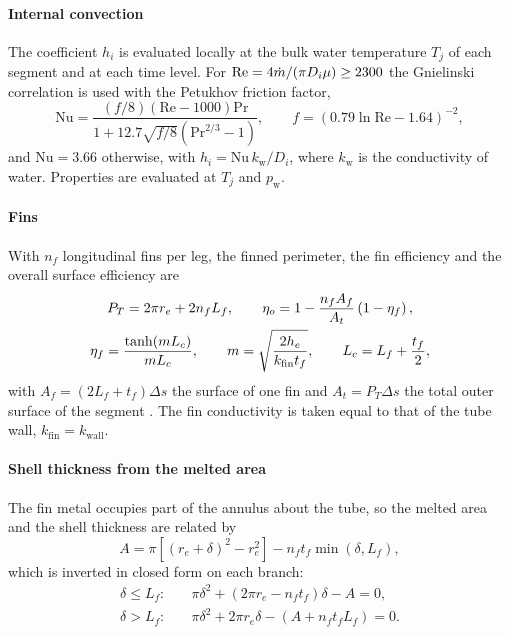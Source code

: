\paragraph{Internal convection} The coefficient $h_i$ is evaluated locally at
the bulk water temperature $T_j$ of each segment and at each time level. For
$\mathrm{Re}=4\dot m/(\pi D_i\mu)\ge2300$ the Gnielinski correlation
\cite{Gnielinski1976} is used with the Petukhov friction factor,
\begin{equation}
  \mathrm{Nu}=\frac{(f/8)(\mathrm{Re}-1000)\mathrm{Pr}}
    {1+12.7\sqrt{f/8}\left(\mathrm{Pr}^{2/3}-1\right)},
  \qquad
  f=\left(0.79\ln\mathrm{Re}-1.64\right)^{-2},
  \label{eq:gnielinski}
\end{equation}
and $\mathrm{Nu}=3.66$ otherwise, with $h_i=\mathrm{Nu}\,k_\mathrm{w}/D_i$, where $k_\mathrm{w}$ is the conductivity of water. Properties are evaluated at $T_j$ and $p_\mathrm{w}$.

\paragraph{Fins} With $n_f$ longitudinal fins per leg, the finned perimeter,
the fin efficiency and the overall surface efficiency are
\begin{gather}
  P_T=2\pi r_e+2n_fL_f,
  \qquad
  \eta_{o}=1-\frac{n_fA_f}{A_t}\left(1-\eta_{f}\right),
  \label{eq:fins}\\
  \eta_{f}=\frac{\tanh(mL_c)}{mL_c},
  \qquad m=\sqrt{\frac{2h_e}{k_\mathrm{fin}t_f}},
  \qquad L_c=L_f+\frac{t_f}{2},
  \label{eq:fin-eff}
\end{gather}
with $A_f=(2L_f+t_f)\Delta s$ the surface of one fin and $A_t=P_T\Delta s$
the total outer surface of the segment \cite{Incropera}. The fin conductivity
is taken equal to that of the tube wall, $k_\mathrm{fin}=k_\mathrm{wall}$.

\paragraph{Shell thickness from the melted area}
The fin metal occupies part of the annulus about the tube, so the melted area
and the shell thickness are related by
\begin{equation}
  A=\pi\left[(r_e+\delta)^{2}-r_e^{2}\right]-n_ft_f\min(\delta,L_f),
  \label{eq:area-fins}
\end{equation}
which is inverted in closed form on each branch:
\begin{align}
  \delta\le L_f:&\quad
    \pi\delta^{2}+\left(2\pi r_e-n_ft_f\right)\delta-A=0,
  \label{eq:delta-in}\\
  \delta>L_f:&\quad
    \pi\delta^{2}+2\pi r_e\delta-\left(A+n_ft_fL_f\right)=0 .
  \label{eq:delta-out}
\end{align}

